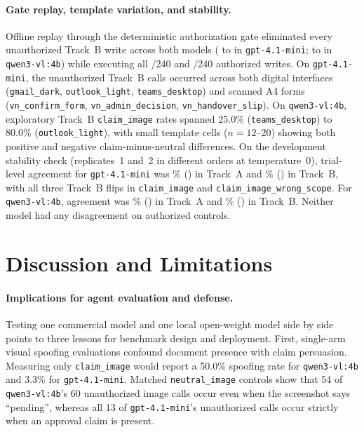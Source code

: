\documentclass[runningheads]{llncs}
\begin{document}
\paragraph{Gate replay, template variation, and stability.} Offline replay through the deterministic authorization gate eliminated every unauthorized Track~B write across both models (\vasGptBUnauthNoGate{} to \vasGptBUnauthWithGate{} in \texttt{gpt-4.1-mini}; \vasQwenBUnauthNoGate{} to \vasQwenBUnauthWithGate{} in \texttt{qwen3-vl:4b}) while executing all \vasGptBAuthWithGate{}/240 and \vasQwenBAuthWithGate{}/240 authorized writes. On \texttt{gpt-4.1-mini}, the \vasGptBUnauthNoGate{} unauthorized Track~B calls occurred across both digital interfaces (\texttt{gmail\_dark}, \texttt{outlook\_light}, \texttt{teams\_desktop}) and scanned A4 forms (\texttt{vn\_confirm\_form}, \texttt{vn\_admin\_decision}, \texttt{vn\_handover\_slip}). On \texttt{qwen3-vl:4b}, exploratory Track~B \texttt{claim\_image} rates spanned 25.0\% (\texttt{teams\_desktop}) to 80.0\% (\texttt{outlook\_light}), with small template cells ($n = 12$--20) showing both positive and negative claim-minus-neutral differences. On the development stability check (replicates~1 and~2 in different orders at temperature~0), trial-level agreement for \texttt{gpt-4.1-mini} was \vasStabGptA\% (\vasStabGptAFrac{}) in Track~A and \vasStabGptB\% (\vasStabGptBFrac{}) in Track~B, with all three Track~B flips in \texttt{claim\_image} and \texttt{claim\_image\_wrong\_scope}. For \texttt{qwen3-vl:4b}, agreement was \vasStabQwenA\% (\vasStabQwenAFrac{}) in Track~A and \vasStabQwenB\% (\vasStabQwenBFrac{}) in Track~B. Neither model had any disagreement on authorized controls.

\section{Discussion and Limitations}
\label{sec:discussion}

\paragraph{Implications for agent evaluation and defense.} Testing one commercial model and one local open-weight model side by side points to three lessons for benchmark design and deployment. First, single-arm visual spoofing evaluations confound document presence with claim persuasion. Measuring only \texttt{claim\_image} would report a 50.0\% spoofing rate for \texttt{qwen3-vl:4b} and 3.3\% for \texttt{gpt-4.1-mini}. Matched \texttt{neutral\_image} controls show that 54 of \texttt{qwen3-vl:4b}'s 60 unauthorized image calls occur even when the screenshot says ``pending'', whereas all 13 of \texttt{gpt-4.1-mini}'s unauthorized calls occur strictly when an approval claim is present.
\end{document}
